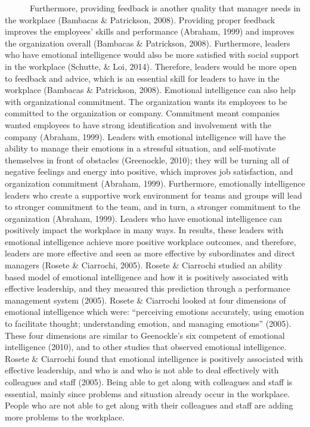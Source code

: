 \documentclass[
  12pt,
]{article}
\begin{document}
~~~~~~Furthermore, providing feedback is another quality that manager needs in the workplace (Bambacas \& Patrickson, 2008). Providing proper feedback improves the employees' skills and performance (Abraham, 1999) and improves the organization overall (Bambacas \& Patrickson, 2008). Furthermore, leaders who have emotional intelligence would also be more satisfied with social support in the workplace (Schutte, \& Loi, 2014). Therefore, leaders would be more open to feedback and advice, which is an essential skill for leaders to have in the workplace (Bambacas \& Patrickson, 2008). Emotional intelligence can also help with organizational commitment. The organization wants its employees to be committed to the organization or company. Commitment meant companies wanted employees to have strong identification and involvement with the company (Abraham, 1999). Leaders with emotional intelligence will have the ability to manage their emotions in a stressful situation, and self-motivate themselves in front of obstacles (Greenockle, 2010); they will be turning all of negative feelings and energy into positive, which improves job satisfaction, and organization commitment (Abraham, 1999). Furthermore, emotionally intelligence leaders who create a supportive work environment for teams and groups will lead to stronger commitment to the team, and in turn, a stronger commitment to the organization (Abraham, 1999). Leaders who have emotional intelligence can positively impact the workplace in many ways. In results, these leaders with emotional intelligence achieve more positive workplace outcomes, and therefore, leaders are more effective and seen as more effective by subordinates and direct managers (Rosete \& Ciarrochi, 2005). Rosete \& Ciarrochi studied an ability based model of emotional intelligence and how it is positively associated with effective leadership, and they measured this prediction through a performance management system (2005). Rosete \& Ciarrochi looked at four dimensions of emotional intelligence which were: ``perceiving emotions accurately, using emotion to facilitate thought; understanding emotion, and managing emotions'' (2005). These four dimensions are similar to Geenockle's six competent of emotional intelligence (2010), and to other studies that observed emotional intelligence. Rosete \& Ciarrochi found that emotional intelligence is positively associated with effective leadership, and who is and who is not able to deal effectively with colleagues and staff (2005). Being able to get along with colleagues and staff is essential, mainly since problems and situation already occur in the workplace. People who are not able to get along with their colleagues and staff are adding more problems to the workplace.
\end{document}
